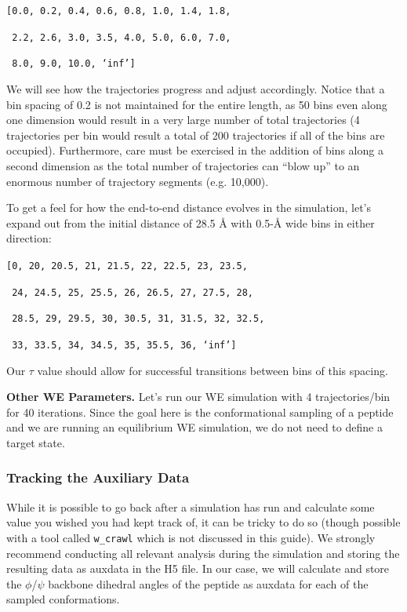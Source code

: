\documentclass[9pt,tutorial,ASAPversion]{livecoms}
\begin{document}
\verb|[0.0, 0.2, 0.4, 0.6, 0.8, 1.0, 1.4, 1.8,|

\verb| 2.2, 2.6, 3.0, 3.5, 4.0, 5.0, 6.0, 7.0,|

\verb| 8.0, 9.0, 10.0, ‘inf’]|

We will see how the trajectories progress and adjust accordingly. 
Notice that a bin spacing of 0.2 is not maintained for the entire length, as 50 bins even along one dimension would result in a very large number of total trajectories (4 trajectories per bin would result a total of 200 trajectories if all of the bins are occupied). 
Furthermore, care must be exercised in the addition of bins along a second dimension as the total number of trajectories can “blow up” to an enormous number of trajectory segments (e.g. 10,000).

To get a feel for how the end-to-end distance evolves in the simulation, let’s expand out from the initial distance of 28.5 \AA{} with 0.5-\AA{} wide bins in either direction:

\verb|[0, 20, 20.5, 21, 21.5, 22, 22.5, 23, 23.5,|

\verb| 24, 24.5, 25, 25.5, 26, 26.5, 27, 27.5, 28,|

\verb| 28.5, 29, 29.5, 30, 30.5, 31, 31.5, 32, 32.5,|

\verb| 33, 33.5, 34, 34.5, 35, 35.5, 36, ‘inf’]|

Our $\tau$ value should allow for successful transitions between bins of this spacing.

\textbf{Other WE Parameters.} Let’s run our WE simulation with 4 trajectories/bin for 40 iterations. 
Since the goal here is the conformational sampling of a peptide and we are running an equilibrium WE simulation, we do not need to define a target state.

\subsubsection{Tracking the Auxiliary Data}

While it is possible to go back after a simulation has run and calculate some value you wished you had kept track of, it can be tricky to do so (though possible with a tool called \verb|w_crawl| which is not discussed in this guide). 
We strongly recommend conducting all relevant analysis during the simulation and storing the resulting data as auxdata in the H5 file. 
In our case, we will  calculate and store the $\phi$/$\psi$ backbone dihedral angles of the peptide as auxdata for each of the sampled conformations.  
\end{document}
